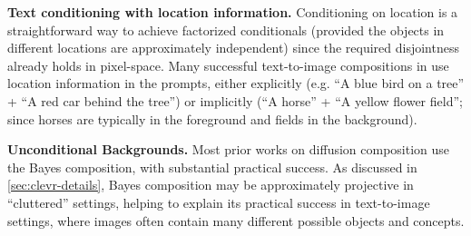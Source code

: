 \textbf{Text conditioning with location information. }
Conditioning on location is a straightforward way to achieve factorized conditionals (provided the objects in different locations are approximately independent) since the required disjointness already holds in pixel-space. 
Many successful text-to-image compositions in \citet{liu2022compositional} use location information in the prompts, either explicitly (e.g. ``A blue bird on a tree'' + ``A red car behind the tree'')
or implicitly
(``A horse'' + ``A yellow flower field''; since horses are typically in the foreground and fields in the background).

\textbf{Unconditional Backgrounds.}
Most prior works on diffusion composition use the Bayes composition, with substantial practical success. 
As discussed in \cref{sec:clevr-details}, Bayes composition may be approximately projective in ``cluttered'' settings,
helping to explain its practical success in text-to-image settings, where images often contain many different possible objects and concepts.



